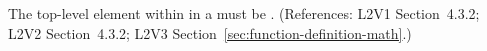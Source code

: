The top-level element within  in a \FunctionDefinition must be
.  (References: L2V1 Section~4.3.2; L2V2 Section~4.3.2;
L2V3 Section~\ref{sec:function-definition-math}.)
